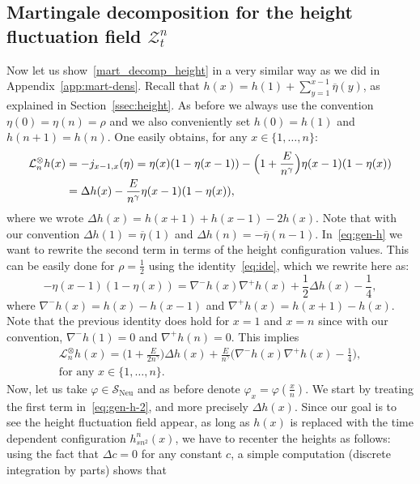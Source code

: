 \documentclass[AHL,Unicode,longabstracts]{cedram}
\DeclareMathOperator{\Neu}{Neu}
\newcommand{\mc}[1]{{\mathcal #1}}
\renewcommand{\mc}[1]{{\mathcal #1}}
\newcommand{\SN}{\ensuremath{\mc S_{\Neu}}}
\renewcommand{\bar}{\overline}
\begin{document}
\subsection{Martingale decomposition for the height fluctuation field \texorpdfstring{$\mc Z_t^n$}{Ztn}}\label{app:mart_dec_height}

Now let us show~\eqref{mart_decomp_height} in a very similar way as we did in Appendix~\ref{app:mart-dens}. Recall that $h(x)=h(1)+\sum_{y=1}^{x-1} \bar\eta(y)$, as explained in Section~\ref{ssec:height}. As before we always use the convention $\eta(0)=\eta(n)=\rho$ and we also conveniently set $h(0)=h(1)$ and $h(n+1)=h(n)$. One easily obtains, for any $x\in\{1,\dots,n\}$:
\begin{align}
\mc L_n^\otimes h(x) & = - j_{x - 1, x} (\eta) = \eta (x) (1 - \eta (x - 1)) -
\Big(1 + \frac{E}{n^{\gamma}} \Big) \eta (x - 1) (1 - \eta (x)) \notag\\
& = \Delta h(x) - \frac{E}{n^{\gamma}} \eta (x - 1) (1 - \eta (x)), \label{eq:gen-h}
\end{align}
where we wrote $\Delta h (x) = h (x + 1) + h (x - 1) - 2 h (x)$. Note that with our convention $\Delta h(1)=\bar \eta(1)$ and $\Delta h(n)=-\bar\eta(n-1)$. In~\eqref{eq:gen-h} we want to rewrite the second term in terms of the height configuration values. This can be easily done for $\rho=\frac12$ using the identity~\eqref{eq:ide}, which we rewrite here as:
\[
- \eta (x - 1) (1 - \eta (x)) = \nabla^- h (x) \nabla^+ h (x) + \frac{1}{2} \Delta h (x) - \frac{1}{4},
\]
where $\nabla^-h(x)=h(x)-h(x-1)$ and $\nabla^+h(x)=h(x+1)-h(x)$. Note that the previous identity does hold for $x=1$ and $x=n$ since with our convention, $\nabla^-h(1)=0$ and $\nabla^+h(n)=0$. This implies
\begin{multline}
\mc L_n^\otimes h(x) = \Big(1+\frac{E}{2n^\gamma}\Big)\Delta h(x) + \frac{E}{n^\gamma} \Big(\nabla^- h (x) \nabla^+ h (x) - \frac14\Big), \\ \text{for any } x\in\{1,\dots,n\}.\label{eq:gen-h-2}
\end{multline}
Now, let us take $\varphi \in \SN$ and as before denote $\varphi_x=\varphi(\frac x n)$. We start by treating the first term in~\eqref{eq:gen-h-2}, and more precisely $\Delta h(x)$. Since our goal is to see the height fluctuation field appear, as long as $h(x)$ is replaced with the time dependent configuration $h_{sn^2}^n(x)$, we have to recenter the heights as follows: using the fact that $\Delta c=0$ for any constant $c$, a simple computation (discrete integration by parts) shows that
\end{document}
